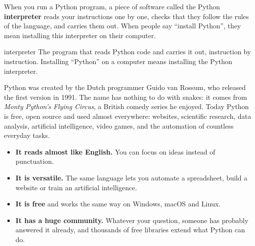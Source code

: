 When you run a Python program, a piece of software called the Python \textbf{interpreter} reads your
instructions one by one, checks that they follow the rules of the language, and carries them out.
When people say \enquote{install Python}, they mean installing this interpreter on their computer.

\begin{center}
\end{center}

\begin{definition}{interpreter}
The program that reads Python code and carries it out, instruction by instruction. Installing
\enquote{Python} on a computer means installing the Python interpreter.
\end{definition}

\begin{culture}
Python was created by the Dutch programmer Guido van Rossum, who released the first version in
1991. The name has nothing to do with snakes: it comes from \emph{Monty Python's Flying Circus}, a
British comedy series he enjoyed. Today Python is free, open source and used almost everywhere:
websites, scientific research, data analysis, artificial intelligence, video games, and the
automation of countless everyday tasks.
\end{culture}

\begin{itemize}
\item \textbf{It reads almost like English.} You can focus on ideas instead of punctuation.
\item \textbf{It is versatile.} The same language lets you automate a spreadsheet, build a website
  or train an artificial intelligence.
\item \textbf{It is free} and works the same way on Windows, macOS and Linux.
\item \textbf{It has a huge community.} Whatever your question, someone has probably answered it
  already, and thousands of free libraries extend what Python can do.
\end{itemize}

